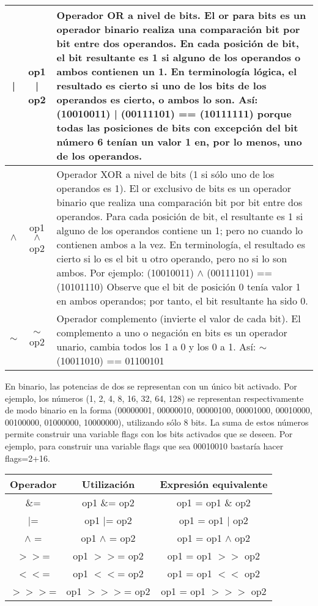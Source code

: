 \begin{longtable}{|c|c|p{11cm}|}
	\hline
	| & op1 | op2 & Operador OR a nivel de bits. El or para bits es un operador binario realiza una comparación bit por bit entre dos operandos.
	En cada posición de bit, el bit resultante es 1 si alguno de los operandos o ambos contienen
	un 1. En terminología lógica, el resultado es cierto si uno de los bits de los operandos es
	cierto, o ambos lo son. Así: (10010011) | (00111101) == (10111111) porque todas las posiciones de bits con excepción del bit número 6 tenían un valor 1 en, por
	lo menos, uno de los operandos. \\
	\hline
	$\wedge$ & op1 $\wedge$ op2 & Operador XOR a nivel de bits (1 si sólo uno de los operandos es 1). El or exclusivo de bits es un operador binario que realiza una comparación bit por bit entre
	dos operandos. Para cada posición de bit, el resultante es 1 si alguno de los operandos
	contiene un 1; pero no cuando lo contienen ambos a la vez. En terminología, el resultado es
	cierto si lo es el bit u otro operando, pero no si lo son ambos. Por ejemplo: (10010011) $\wedge$ (00111101) == (10101110) Observe que el bit de posición 0 tenía valor 1 en ambos operandos; por tanto, el bit resultante
	ha sido 0. \\
	\hline
	$\sim$ & $\sim$op2 & Operador complemento (invierte el valor de cada bit). El complemento a uno o negación en bits es un operador unario, cambia todos los 1 a 0 y
	los 0 a 1. Así: $\sim$(10011010) == 01100101 \\
	\hline
\end{longtable}

En binario, las potencias de dos se representan con un único bit activado. Por ejemplo, los
números (1, 2, 4, 8, 16, 32, 64, 128) se representan respectivamente de modo binario en la forma
(00000001, 00000010, 00000100, 00001000, 00010000, 00100000, 01000000, 10000000),
utilizando sólo 8 bits. La suma de estos números permite construir una variable flags con los bits
activados que se deseen. Por ejemplo, para construir una variable flags que sea 00010010 bastaría
hacer flags=2+16.


\begin{tabular}{|c|c|c|}
	\hline
	\textbf{Operador}	& \textbf{Utilización} &  \textbf{Expresión equivalente} \\
	\hline
	\&= & op1 \&= op2 & op1 = op1 \& op2 \\
	\hline
	|= & op1 |= op2 & op1 = op1 | op2 \\
	\hline
	$\wedge$ = & op1 $\wedge$ = op2 & op1 = op1 $\wedge$  op2 \\
	\hline
	$>>$= & op1 $>>$= op2 & op1 = op1 $>>$ op2 \\
	\hline
	$<<$= & op1 $<<$= op2 & op1 = op1 $<<$  op2 \\
	\hline
	$>>>$= & op1 $>>>$= op2 & op1 = op1 $>>>$  op2 \\
	\hline
\end{tabular}